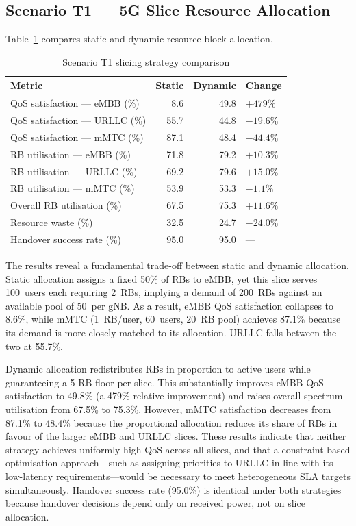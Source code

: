 \subsection{Scenario T1 --- 5G Slice Resource Allocation}

Table~\ref{tab:t1_results} compares static and dynamic resource block allocation.

\begin{table}[h]
    \centering
    \caption{Scenario T1 slicing strategy comparison}
    \label{tab:t1_results}
    \begin{tabular}{lrrl}
        \toprule
        \textbf{Metric} & \textbf{Static} & \textbf{Dynamic} & \textbf{Change} \\
        \midrule
        QoS satisfaction --- eMBB (\%)   & 8.6   & 49.8  & $+479\%$ \\
        QoS satisfaction --- URLLC (\%)  & 55.7  & 44.8  & $-19.6\%$ \\
        QoS satisfaction --- mMTC (\%)   & 87.1  & 48.4  & $-44.4\%$ \\
        RB utilisation --- eMBB (\%)     & 71.8  & 79.2  & $+10.3\%$ \\
        RB utilisation --- URLLC (\%)    & 69.2  & 79.6  & $+15.0\%$ \\
        RB utilisation --- mMTC (\%)     & 53.9  & 53.3  & $-1.1\%$ \\
        Overall RB utilisation (\%)      & 67.5  & 75.3  & $+11.6\%$ \\
        Resource waste (\%)              & 32.5  & 24.7  & $-24.0\%$ \\
        Handover success rate (\%)       & 95.0  & 95.0  & —        \\
        \bottomrule
    \end{tabular}
\end{table}

The results reveal a fundamental trade-off between static and dynamic allocation. Static allocation assigns a fixed 50\% of RBs to eMBB, yet this slice serves 100~users each requiring 2~RBs, implying a demand of 200~RBs against an available pool of 50~per gNB. As a result, eMBB QoS satisfaction collapses to 8.6\%, while mMTC (1~RB/user, 60~users, 20~RB pool) achieves 87.1\% because its demand is more closely matched to its allocation. URLLC falls between the two at 55.7\%.

Dynamic allocation redistributes RBs in proportion to active users while guaranteeing a 5-RB floor per slice. This substantially improves eMBB QoS satisfaction to 49.8\% (a 479\% relative improvement) and raises overall spectrum utilisation from 67.5\% to 75.3\%. However, mMTC satisfaction decreases from 87.1\% to 48.4\% because the proportional allocation reduces its share of RBs in favour of the larger eMBB and URLLC slices. These results indicate that neither strategy achieves uniformly high QoS across all slices, and that a constraint-based optimisation approach---such as assigning priorities to URLLC in line with its low-latency requirements---would be necessary to meet heterogeneous SLA targets simultaneously. Handover success rate (95.0\%) is identical under both strategies because handover decisions depend only on received power, not on slice allocation.

